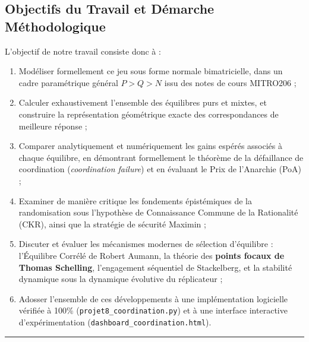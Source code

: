 \documentclass[11pt,a4paper]{article}
\begin{document}
\subsection*{Objectifs du Travail et Démarche Méthodologique}
L'objectif de notre travail consiste donc à :
\begin{enumerate}[label=(\roman*)]
    \item Modéliser formellement ce jeu sous forme normale bimatricielle, dans un cadre paramétrique général $P > Q > N$ issu des notes de cours MITRO206 ;
    \item Calculer exhaustivement l'ensemble des équilibres purs et mixtes, et construire la représentation géométrique exacte des correspondances de meilleure réponse ;
    \item Comparer analytiquement et numériquement les gains espérés associés à chaque équilibre, en démontrant formellement le théorème de la défaillance de coordination (\emph{coordination failure}) et en évaluant le Prix de l'Anarchie (PoA) ;
    \item Examiner de manière critique les fondements épistémiques de la randomisation sous l'hypothèse de Connaissance Commune de la Rationalité (CKR), ainsi que la stratégie de sécurité Maximin ;
    \item Discuter et évaluer les mécanismes modernes de sélection d'équilibre : l'Équilibre Corrélé de Robert Aumann, la théorie des \textbf{points focaux de Thomas Schelling}, l'engagement séquentiel de Stackelberg, et la stabilité dynamique sous la dynamique évolutive du réplicateur ;
    \item Adosser l'ensemble de ces développements à une implémentation logicielle vérifiée à 100\% (\texttt{projet8\_}\allowbreak\texttt{coordination.py}) et à une interface interactive d'expérimentation (\texttt{dashboard\_}\allowbreak\texttt{coordination.html}).
\end{enumerate}

\newpage
\tableofcontents
\vspace{0.6cm}
\hrule
\vspace{0.6cm}
\end{document}
